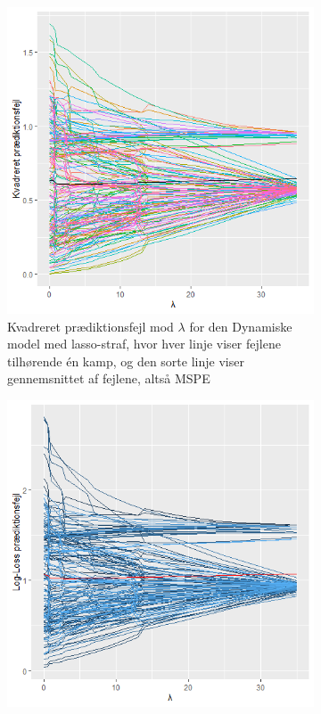 \documentclass[11pt,a4paper]{article}
\begin{document}
\begin{figure}[h!]
  \centering
  \begin{subfigure}[b]{0.425\linewidth}
    \includegraphics[width=\textwidth]{MSPELINEALPHA.png}
    \caption{Kvadreret prædiktionsfejl mod $\lambda$ for den Dynamiske model med lasso-straf, hvor hver linje viser fejlene tilhørende én kamp, og den sorte linje viser gennemsnittet af fejlene, altså MSPE}
    \label{fig:DynMSPELine}
  \end{subfigure}
     \hspace{0.2cm}
  \begin{subfigure}[b]{0.425\linewidth}
\includegraphics[width=\textwidth]{LINELOGLOSSALPHA.png}

\end{subfigure}
\end{figure}
\end{document}
